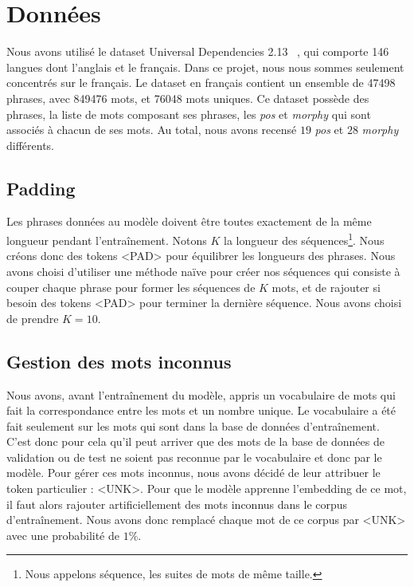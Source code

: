 \documentclass[a4paper]{article}
\begin{document}
\section{Données}

Nous avons utilisé le dataset Universal Dependencies 2.13 ~\cite{11234/1-5287}, qui comporte 146 langues dont l'anglais
et le français. Dans ce projet, nous nous sommes seulement concentrés sur le français.
Le dataset en français contient un ensemble de 47498 phrases, avec 849476 mots, et 76048 mots uniques.
Ce dataset possède des phrases, la liste de mots composant ses phrases, les \textit{pos} et \textit{morphy} qui sont associés à chacun de ses mots. Au total, nous avons recensé $19$ \textit{pos} et 
$28$ \textit{morphy} différents.

\subsection{Padding}

Les phrases données au modèle doivent être toutes exactement de la même longueur pendant l'entraînement. 
Notons $K$ la longueur des séquences\footnote{Nous appelons séquence, les suites de mots de même taille.}. Nous créons donc des 
tokens <PAD> pour équilibrer les longueurs des phrases.
Nous avons choisi d'utiliser une méthode naïve pour créer nos séquences qui consiste à couper chaque phrase pour former les séquences
de $K$ mots, et de rajouter si besoin des tokens <PAD> pour terminer la dernière séquence. Nous avons choisi de prendre $K=10$.

\subsection{Gestion des mots inconnus}

Nous avons, avant l'entraînement du modèle, appris un vocabulaire de mots qui fait la correspondance entre les mots et un nombre unique.
Le vocabulaire a été fait seulement sur les mots qui sont dans la base de données d'entraînement. C'est donc pour cela qu'il peut
arriver que des mots de la base de données de validation ou de test ne soient pas reconnue par le vocabulaire et donc par le modèle.
Pour gérer ces mots inconnus, nous avons décidé de leur attribuer le token particulier : <UNK>. Pour que le modèle
apprenne l'embedding de ce mot, il faut alors rajouter artificiellement des mots inconnus dans le corpus d'entraînement. Nous avons
donc remplacé chaque mot de ce corpus par <UNK> avec une probabilité de $1\%$.
\end{document}
